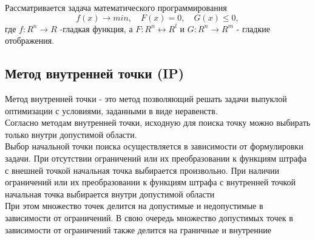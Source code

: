 \documentclass[12pt,a4paper]{article}
\begin{document}
	Рассматривается задача математического программирования
	\begin{equation}\label{eq:0}
		f(x) \longrightarrow min, \quad F(x) = 0,\quad G(x) \leq 0,
	\end{equation}
где $f:R^n \longrightarrow R$ -гладкая функция, а $F:R^n \longleftrightarrow R^l$ и $G:R^n \longrightarrow R^m$ - гладкие отображения.
	\subsection{Метод внутренней точки (IP)}
	Метод внутренней точки - это метод позволяющий решать задачи выпуклой оптимизации с условиями, заданными в виде неравенств.
	\\
	Согласно методам внутренней точки, исходную для поиска точку можно выбирать только внутри допустимой области.
	\\	
	Выбор начальной точки поиска осуществляется в зависимости от формулировки задачи. При отсутствии ограничений или их преобразовании к функциям штрафа с внешней точкой начальная точка выбирается произвольно. При наличии ограничений или их преобразовании к функциям штрафа с внутренней точкой начальная точка выбирается внутри допустимой области
	\\
	При этом множество точек делится на допустимые и недопустимые в зависимости от ограничений. В свою очередь множество допустимых точек в зависимости от ограничений также делится на граничные и внутренние
	
\end{document}
